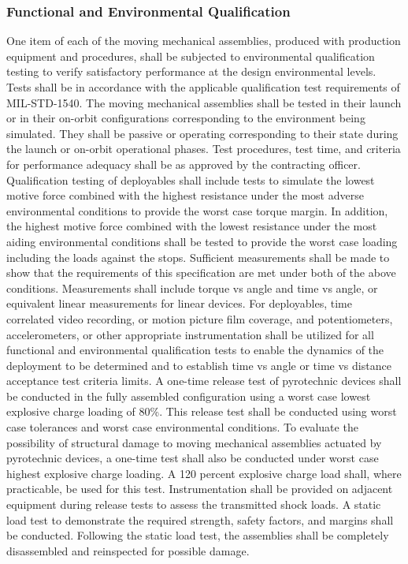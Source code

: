 \documentclass[12pt]{article}
\begin{document}
\subsubsection{Functional and Environmental Qualification} %
One item of each of the moving mechanical assemblies, produced with production equipment and procedures, shall be subjected to environmental qualification testing to verify satisfactory performance at the design environmental levels. 
Tests shall be in accordance with the applicable qualification test requirements of MIL-STD-1540. 
The moving mechanical assemblies shall be tested in their launch or in their on-orbit configurations corresponding to the environment being simulated. 
They shall be passive or operating corresponding to their state during the launch or on-orbit operational phases. 
Test procedures, test time, and criteria for performance adequacy shall be as approved by the contracting officer. 
Qualification testing of deployables shall include tests to simulate the lowest motive force combined with the highest resistance under the most adverse environmental conditions to provide the worst case torque margin. 
In addition, the highest motive force combined with the lowest resistance under the most aiding environmental conditions shall be tested to provide the worst case loading including the loads against the stops. 
Sufficient measurements shall be made to show that the requirements of this specification are met under both of the above conditions. 
Measurements shall include torque vs angle and time vs angle, or equivalent linear measurements for linear devices. 
For deployables, time correlated video recording, or motion picture film coverage, and potentiometers, accelerometers, or other appropriate instrumentation shall be utilized for all functional and environmental qualification tests to enable the
dynamics of the deployment to be determined and to establish time vs angle or time vs distance acceptance test criteria limits. 
A one-time release test of pyrotechnic devices shall be conducted in the fully assembled configuration using a worst case lowest explosive charge loading of 80\%. 
This release test shall be conducted using worst case tolerances and worst case environmental conditions. 
To evaluate the possibility of structural damage to moving mechanical assemblies actuated by pyrotechnic devices, a one-time test shall also be conducted under worst case highest explosive charge loading. 
A 120 percent explosive charge load shall, where practicable, be used for this test. 
Instrumentation shall be provided on adjacent equipment during release tests to assess the transmitted shock loads. 
A static load test to demonstrate the required strength, safety factors, and margins shall be conducted. 
Following the static load test, the assemblies shall be completely disassembled and reinspected for possible damage.
\end{document}
